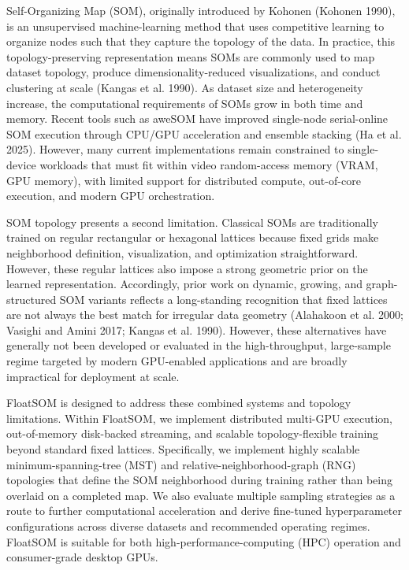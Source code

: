 \documentclass[
]{article}
\providecommand{\DIFadd}[1]{{\protect\color{blue} #1}} %
\providecommand{\DIFaddbegin}{} %
\providecommand{\DIFaddend}{} %
\begin{document}
Self-Organizing Map (SOM), originally introduced by Kohonen (Kohonen
1990), is an unsupervised machine-learning method that uses competitive
learning to organize nodes such that they capture the topology of the
data. In practice, this topology-preserving representation means SOMs
are commonly used to map dataset topology, produce
dimensionality-reduced visualizations, and conduct clustering at scale
(Kangas et al. 1990). As dataset size and heterogeneity increase, the
computational requirements of SOMs grow in both time and memory.  \DIFaddbegin \DIFadd{Recent
tools such as aweSOM have improved single-node serial-online SOM
execution through CPU/GPU acceleration and ensemble stacking (Ha et al.
2025). However, many current implementations }\DIFaddend remain constrained to
single-device workloads that must fit within video random-access memory
(VRAM, GPU memory), with limited support for distributed compute,
out-of-core execution, and modern GPU orchestration.

SOM topology presents a second limitation. Classical SOMs are
traditionally trained on regular rectangular or hexagonal lattices
because fixed grids make neighborhood definition, visualization, and
optimization straightforward. However, these regular lattices also
impose a strong geometric prior on the learned representation.
Accordingly, prior work on dynamic, growing, and graph-structured SOM
variants reflects a long-standing recognition that fixed lattices are
not always the best match for irregular data geometry (Alahakoon et al.
2000; Vasighi and Amini 2017; Kangas et al. 1990). However, these
alternatives have generally not been developed or evaluated in the
high-throughput, large-sample regime targeted by modern GPU-enabled
applications and are broadly impractical for deployment at scale.

FloatSOM is designed to address these combined systems and topology
limitations. Within FloatSOM, we implement distributed multi-GPU
execution, out-of-memory disk-backed streaming, and scalable
topology-flexible training beyond standard fixed lattices. Specifically,
we implement highly scalable minimum-spanning-tree (MST) and
relative-neighborhood-graph (RNG) topologies \DIFaddbegin \DIFadd{that define the SOM
neighborhood during training rather than being overlaid on a completed
map}\DIFaddend . We also evaluate multiple sampling strategies as a route to further
computational acceleration and derive fine-tuned hyperparameter
configurations across diverse datasets and recommended operating
regimes. FloatSOM is suitable for both high-performance-computing (HPC)
operation and consumer-grade desktop GPUs.
\end{document}
